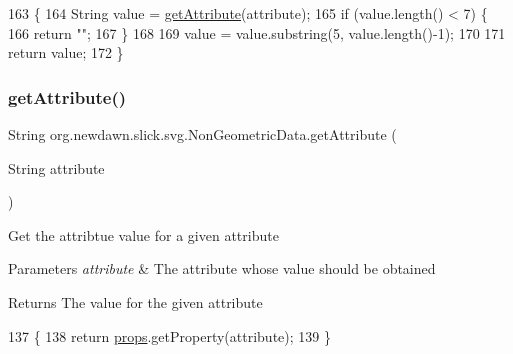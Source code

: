 \begin{DoxyCode}
163                                                    \{
164         String value = \mbox{\hyperlink{classorg_1_1newdawn_1_1slick_1_1svg_1_1_non_geometric_data_af14f4628737e3da9379ac25e0a56a92d}{getAttribute}}(attribute);
165         \textcolor{keywordflow}{if} (value.length() < 7) \{
166             \textcolor{keywordflow}{return} \textcolor{stringliteral}{""};
167         \}
168         
169         value = value.substring(5, value.length()-1);
170         
171         \textcolor{keywordflow}{return} value;
172     \}
\end{DoxyCode}
\mbox{\label{classorg_1_1newdawn_1_1slick_1_1svg_1_1_non_geometric_data_af14f4628737e3da9379ac25e0a56a92d}} 
\subsubsection{\texorpdfstring{get\+Attribute()}{getAttribute()}}
{\footnotesize\ttfamily String org.\+newdawn.\+slick.\+svg.\+Non\+Geometric\+Data.\+get\+Attribute (\begin{DoxyParamCaption}\item[{String}]{attribute }\end{DoxyParamCaption})\hspace{0.3cm}{\ttfamily [inline]}}

Get the attribtue value for a given attribute


\begin{DoxyParams}{Parameters}
{\em attribute} & The attribute whose value should be obtained \\
\hline
\end{DoxyParams}
\begin{DoxyReturn}{Returns}
The value for the given attribute 
\end{DoxyReturn}

\begin{DoxyCode}
137                                                  \{
138         \textcolor{keywordflow}{return} \mbox{\hyperlink{classorg_1_1newdawn_1_1slick_1_1svg_1_1_non_geometric_data_a75a905ff1c7bf271e32602cdc7f06191}{props}}.getProperty(attribute);
139     \}
\end{DoxyCode}
\mbox{\label{classorg_1_1newdawn_1_1slick_1_1svg_1_1_non_geometric_data_ad054d28cdc3c4070707e0b92b3e5ed0a}} 

